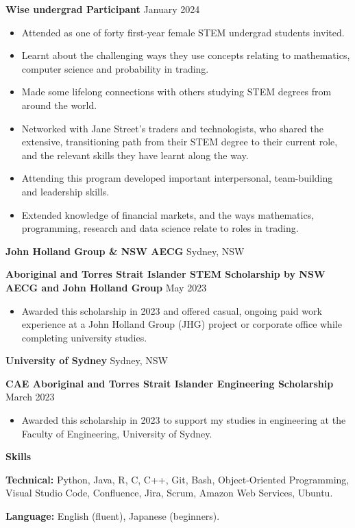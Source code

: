 \documentclass[11pt]{article}
\begin{document}
\textbf{Wise undergrad Participant} \hfill January 2024
\begin{itemize}[noitemsep, topsep=0pt, partopsep=0pt, parsep=0pt]
    \item Attended as one of forty first-year female STEM undergrad students invited.
    \item Learnt about the challenging ways they use concepts relating to mathematics, computer science and probability in trading.
    \item Made some lifelong connections with others studying STEM degrees from around the world.
    \item Networked with Jane Street’s traders and technologists, who shared the extensive, transitioning path from their STEM degree to their current role, and the relevant skills they have learnt along the way.
    \item Attending this program developed important interpersonal, team-building and leadership skills.
    \item Extended knowledge of financial markets, and the ways mathematics, programming, research and data science relate to roles in trading.
\end{itemize}

\vspace{12pt}

\textbf{John Holland Group \& NSW AECG} \hfill Sydney, NSW

\textbf{Aboriginal and Torres Strait Islander STEM Scholarship by NSW AECG and John Holland Group} \hfill May 2023
\begin{itemize}[noitemsep, topsep=0pt, partopsep=0pt, parsep=0pt]
    \item Awarded this scholarship in 2023 and offered casual, ongoing paid work experience at a John Holland Group (JHG) project or corporate office while completing university studies.
\end{itemize}

\vspace{12pt}

\textbf{University of Sydney} \hfill Sydney, NSW

\textbf{CAE Aboriginal and Torres Strait Islander Engineering Scholarship} \hfill March 2023
\begin{itemize}[noitemsep, topsep=0pt, partopsep=0pt, parsep=0pt]
    \item Awarded this scholarship in 2023 to support my studies in engineering at the Faculty of Engineering, University of Sydney.
\end{itemize}

\vspace{12pt}

\begin{center}
    \textbf{Skills}\\
    \hrulefill
\end{center}

\textbf{Technical:} Python, Java, R, C, C++, Git, Bash, Object-Oriented Programming, Visual Studio Code, Confluence, Jira, Scrum, Amazon Web Services, Ubuntu.

\textbf{Language:} English (fluent), Japanese (beginners).
\end{document}
